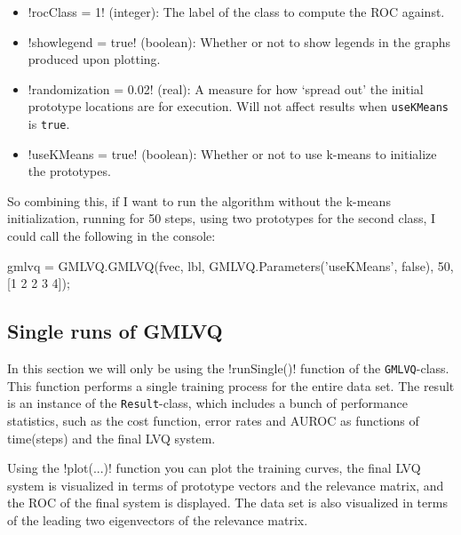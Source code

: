 \documentclass[a4paper,10pt]{article}
\begin{document}
\begin{itemize}
\item \mat!rocClass = 1! (integer): The label of the class to compute the ROC against.
\item \mat!showlegend = true! (boolean): Whether or not to show legends in the graphs produced upon plotting.
\item \mat!randomization = 0.02! (real): A measure for how `spread out' the initial prototype locations are for execution. Will not affect results when {\tt useKMeans} is {\tt true}.
\item \mat!useKMeans = true! (boolean): Whether or not to use k-means to initialize the prototypes.
\end{itemize}

So combining this, if I want to run the algorithm without the k-means initialization, running for 50 steps, using two prototypes for the second class, I could call the following in the console:
\begin{mats}
gmlvq = GMLVQ.GMLVQ(fvec, lbl, GMLVQ.Parameters('useKMeans', false), 50, [1 2 2 3 4]);
\end{mats}

\subsection{Single runs of GMLVQ}
In this section we will only be using the \mat!runSingle()! function of the {\tt GMLVQ}-class. This function performs a single training process for the entire data set. The result is an instance of the {\tt Result}-class, which includes a bunch of performance statistics, such as the cost function, error rates and AUROC as functions of time(steps) and the final LVQ system.

Using the \mat!plot(...)! function you can plot the training curves, the final LVQ system is visualized in terms of prototype vectors and the relevance matrix, and the ROC of the final system is displayed. The data set is also visualized in terms of the leading two eigenvectors of the relevance matrix.

\newpage
\end{document}

